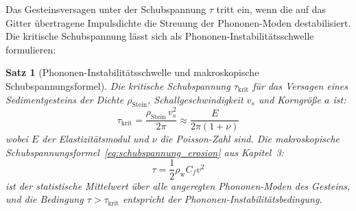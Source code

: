 ﻿\documentclass[12pt,a4paper]{report}
\newtheorem{theorem}{Satz}[chapter]
\begin{document}
Das Gesteinsversagen unter der Schubspannung $\tau$ tritt ein, wenn die auf das Gitter übertragene Impulsdichte die Streuung der Phononen-Moden destabilisiert. Die kritische Schubspannung lässt sich als Phononen-Instabilitätsschwelle formulieren:

\begin{theorem}[Phononen-Instabilitätsschwelle und makroskopische Schubspannungsformel]
	\label{thm:phononen}
	Die kritische Schubspannung $\tau_\mathrm{krit}$ für das Versagen eines Sedimentgesteins der Dichte $\rho_\mathrm{Stein}$, Schallgeschwindigkeit $v_s$ und Korngröße $a$ ist:
	\begin{equation}
		\tau_\mathrm{krit} = \frac{\rho_\mathrm{Stein}\,v_s^2}{2\pi} \approx \frac{E}{2\pi(1+\nu)}
		\label{eq:tau_krit_phonon}
	\end{equation}
	wobei $E$ der Elastizitätsmodul und $\nu$ die Poisson-Zahl sind. Die makroskopische Schubspannungsformel~\eqref{eq:schubspannung_erosion} aus Kapitel~3:
	\begin{equation}
		\tau = \frac{1}{2}\rho_\mathrm{w} C_f v^2
		\label{eq:schubspannung_erosion}
	\end{equation}
	ist der statistische Mittelwert über alle angeregten Phononen-Moden des Gesteins, und die Bedingung $\tau > \tau_\mathrm{krit}$ entspricht der Phononen-Instabilitätsbedingung.
\end{theorem}
\end{document}
